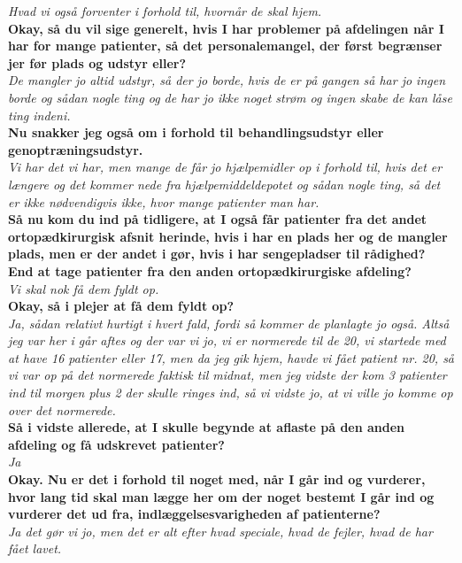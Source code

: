 \noindent
\textit{ Hvad vi også forventer i forhold til, hvornår de skal hjem.} \\
\noindent
\textbf{Okay, så du vil sige generelt, hvis I har problemer på afdelingen når I har for mange patienter, så det personalemangel, der først begrænser jer før plads og udstyr eller?} \\
\noindent
\textit{De mangler jo altid udstyr, så der jo borde, hvis de er på gangen så har jo ingen borde og sådan nogle ting og de har jo ikke noget strøm og ingen skabe de kan låse ting indeni.} \\
\noindent
\textbf{ Nu snakker jeg også om i forhold til behandlingsudstyr eller genoptræningsudstyr.} \\
\noindent
\textit{Vi har det vi har, men mange de får jo hjælpemidler op i forhold til, hvis det er længere og det kommer nede fra hjælpemiddeldepotet og sådan nogle ting, så det er ikke nødvendigvis ikke, hvor mange patienter man har. } \\
\noindent
\textbf{Så nu kom du ind på tidligere, at I også får patienter fra det andet ortopædkirurgisk afsnit herinde, hvis i har en plads her og de mangler plads, men er der andet i gør, hvis i har sengepladser til rådighed? End at tage patienter fra den anden ortopædkirurgiske afdeling? } \\
\noindent
\textit{Vi skal nok få dem fyldt op. } \\
\noindent
\textbf{Okay, så i plejer at få dem fyldt op? } \\
\noindent
\textit{Ja, sådan relativt hurtigt i hvert fald, fordi så kommer de planlagte jo også. Altså jeg var her i går aftes og der var vi jo, vi er normerede til de 20, vi startede med at have 16 patienter eller 17, men da jeg gik hjem, havde vi fået patient nr. 20, så vi var op på det normerede faktisk til midnat, men jeg vidste der kom 3 patienter ind til morgen plus 2 der skulle ringes ind, så vi vidste jo, at vi ville jo komme op over det normerede.} \\
\noindent
\textbf{Så i vidste allerede, at I skulle begynde at aflaste på den anden afdeling og få udskrevet patienter?} \\
\noindent
\textit{Ja} \\
\noindent
\textbf{Okay. Nu er det i forhold til noget med, når I går ind og vurderer, hvor lang tid skal man lægge her om der noget bestemt I går ind og vurderer det ud fra, indlæggelsesvarigheden af patienterne?} \\
\noindent
\textit{ Ja det gør vi jo, men det er alt efter hvad speciale, hvad de fejler, hvad de har fået lavet.}  \\
